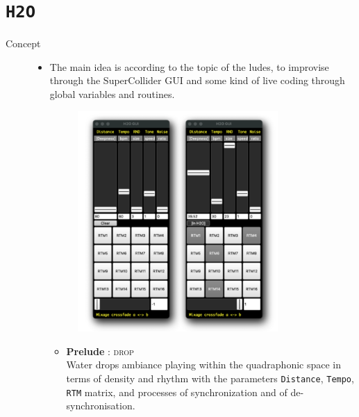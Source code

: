 
\section*{\texttt{H2O}}

\thispagestyle{empty}

\bigskip

\begin{description}
\item[Concept] \hfill 
	\begin{itemize}
	\item[] The main idea is according to the topic of the ludes, to improvise through the SuperCollider GUI and some kind of live coding through global variables and routines.
	\begin{figure}[H]
	\hfill \includegraphics[width=0.8\textwidth]{mp/img/7589}
	\end{figure}
		\begin{itemize}[leftmargin=0.4in]
		\item \textbf{Prelude} : \textsc{drop} \\ Water drops ambiance playing within the quadraphonic space in terms of density and rhythm with the parameters \texttt{Distance}, \texttt{Tempo}, \texttt{RTM} matrix, and processes of synchronization and of de-synchronisation.

\end{itemize}
\end{itemize}
\end{description}
